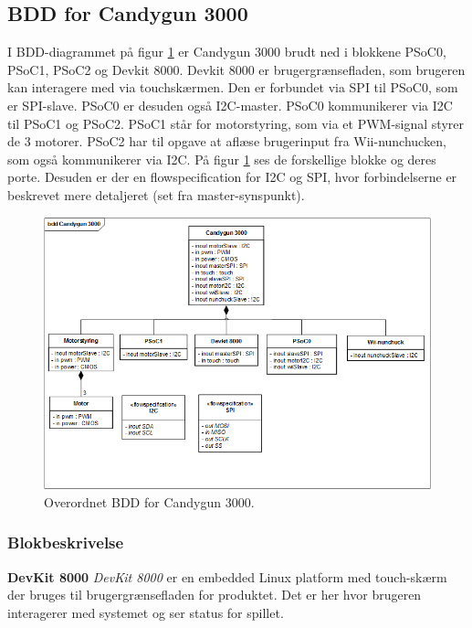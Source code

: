\subsection{BDD for Candygun 3000}
I BDD-diagrammet på figur \ref{fig:BDD} er Candygun 3000 brudt ned i blokkene PSoC0, PSoC1, PSoC2 og Devkit 8000. Devkit 8000 er brugergrænsefladen, som brugeren kan interagere med via touchskærmen. Den er forbundet via SPI til PSoC0, som er SPI-slave. PSoC0 er desuden også I2C-master. PSoC0 kommunikerer via I2C til PSoC1 og PSoC2. PSoC1 står for motorstyring, som via et PWM-signal styrer de 3 motorer. PSoC2 har til opgave at aflæse brugerinput fra Wii-nunchucken, som også kommunikerer via I2C. På figur \ref{fig:BDD} ses de forskellige blokke og deres porte. Desuden er der en flowspecification for I2C og SPI, hvor forbindelserne er beskrevet mere detaljeret (set fra master-synspunkt). 

\begin{figure}[H]
	\centering
	\includegraphics[width= \textwidth]{Systemarkitektur/images/BDD_overordnet.png}
	\caption{Overordnet BDD for Candygun 3000.}
	\label{fig:BDD}
\end{figure}


\subsubsection{Blokbeskrivelse}
\textbf{DevKit 8000}
\newline
\textit{DevKit 8000} er en embedded Linux platform med touch-skærm der bruges til brugergrænsefladen for produktet. Det er her hvor brugeren interagerer med systemet og ser status for spillet.

